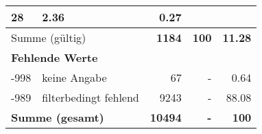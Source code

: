 \begin{longtable}{lXrrr}
       \num{28} &
       \num[round-mode=places,round-precision=2]{2,36} &
         \num[round-mode=places,round-precision=2]{0,27} \\
     \midrule
     \multicolumn{2}{l}{Summe (gültig)} &
       \textbf{\num{1184}} &
     \textbf{100} &
       \textbf{\num[round-mode=places,round-precision=2]{11,28}} \\
     \multicolumn{5}{l}{\textbf{Fehlende Werte}}\\
       -998 &
       keine Angabe &
         \num{67} &
        - &
         \num[round-mode=places,round-precision=2]{0,64} \\
       -989 &
       filterbedingt fehlend &
         \num{9243} &
        - &
         \num[round-mode=places,round-precision=2]{88,08} \\
     \midrule
     \multicolumn{2}{l}{\textbf{Summe (gesamt)}} &
          \textbf{\num{10494}} &
        \textbf{-} &
        \textbf{100} \\
     \bottomrule
     \end{longtable}
     
